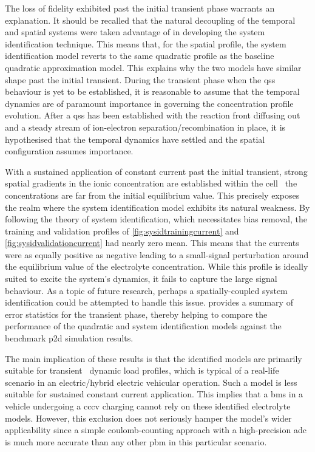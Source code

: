 The  loss  of fidelity  exhibited  past  the  initial transient  phase  warrants
an  explanation. It  should  be  recalled that  the  natural  decoupling of  the
temporal and  spatial systems were taken  advantage of in developing  the system
identification technique. This  means that, for the spatial  profile, the system
identification  model reverts  to the  same  quadratic profile  as the  baseline
quadratic approximation  model. This  explains why the  two models  have similar
shape past the initial transient. During  the transient phase when the \gls{qss}
behaviour is yet to be established, it is reasonable to assume that the temporal
dynamics  are of  paramount importance  in governing  the concentration  profile
evolution.  After a  \gls{qss}  has  been established  with  the reaction  front
diffusing out  and a steady  stream of ion-electron  separation/recombination in
place,  it is  hypothesised  that the  temporal dynamics  have  settled and  the
spatial configuration assumes importance.

With a  sustained application  of constant current  past the  initial transient,
strong spatial gradients  in the ionic concentration are  established within the
cell \ie~the  concentrations are far from the initial  equilibrium value. This
precisely  exposes the  realm  where the  system  identification model  exhibits
its  natural  weakness.  By  following  the  theory  of  system  identification,
which  necessitates   bias  removal,   the  training  and   validation  profiles
of \cref{fig:sysidtrainingcurrent}   and \cref{fig:sysidvalidationcurrent}   had
nearly  zero mean.  This means  that the  currents were  as equally  positive as
negative leading to a small-signal  perturbation around the equilibrium value of
the electrolyte  concentration. While this  profile is ideally suited  to excite
the system's  dynamics, it  fails to  capture the large  signal behaviour.  As a
topic  of future  research,  perhaps a  spatially-coupled system  identification
could be attempted to handle this issue.
 provides a summary of error
statistics for the transient phase, thereby helping to compare the performance
of the quadratic and system identification models against the benchmark
\gls{p2d} simulation results.



The  main  implication of  these  results  is  that  the identified  models  are
primarily suitable for  transient \ie~dynamic load profiles,  which is typical
of a real-life scenario in an electric/hybrid electric vehicular operation. Such
a  model is  less  suitable  for sustained  constant  current application.  This
implies that  a \gls{bms} in a  vehicle undergoing a \gls{cccv}  charging cannot
rely on  these identified electrolyte  models. However, this exclusion  does not
seriously hamper the model's wider applicability since a simple coulomb-counting
approach with  a high-precision \gls{adc} is  much more accurate than  any other
\gls{pbm} in this particular scenario.


